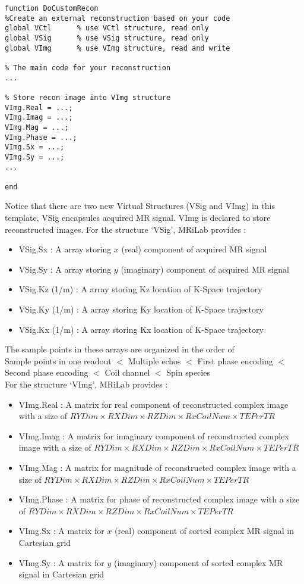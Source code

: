 \documentclass{book}%
\begin{document}
\begin{verbatim}
function DoCustomRecon
%Create an external reconstruction based on your code
global VCtl      % use VCtl structure, read only
global VSig      % use VSig structure, read only
global VImg      % use VImg structure, read and write

% The main code for your reconstruction
...

% Store recon image into VImg structure
VImg.Real = ...;
VImg.Imag = ...;
VImg.Mag = ...;
VImg.Phase = ...;
VImg.Sx = ...;
VImg.Sy = ...;
...

end
\end{verbatim}

Notice that there are two new Virtual Structures (VSig and VImg) in this template, VSig encapsules acquired MR signal. VImg is declared to store reconstructed images. For the structure `VSig', MRiLab provides :

\begin{itemize}
	\item VSig.Sx : A array storing $x$ (real) component of acquired MR signal
	\item VSig.Sy : A array storing $y$ (imaginary) component of acquired MR signal
	\item VSig.Kz (1/m) : A array storing Kz location of K-Space trajectory
	\item VSig.Ky (1/m) : A array storing Ky location of K-Space trajectory
	\item VSig.Kx (1/m) : A array storing Kx location of K-Space trajectory
\end{itemize}

The sample points in these arrays are organized in the order of \\

Sample points in one readout $<$ Multiple echos $<$ First phase encoding $<$ Second phase encoding $<$ Coil channel $<$ Spin species \\

For the structure `VImg', MRiLab provides : 
\begin{itemize}
	\item VImg.Real : A matrix for real component of reconstructed complex image with a size of $ RYDim \times RXDim \times RZDim \times RxCoilNum \times TEPerTR$
	\item VImg.Imag : A matrix for imaginary component of reconstructed complex image with a size of $ RYDim \times RXDim \times RZDim \times RxCoilNum \times TEPerTR$
	\item VImg.Mag : A matrix for magnitude of reconstructed complex image with a size of $ RYDim \times RXDim \times RZDim \times RxCoilNum \times TEPerTR$
	\item VImg.Phase : A matrix for phase of reconstructed complex image with a size of $ RYDim \times RXDim \times RZDim \times RxCoilNum \times TEPerTR$
	\item VImg.Sx : A matrix for $x$ (real) component of sorted complex MR signal in Cartesian grid
	\item VImg.Sy : A matrix for $y$ (imaginary) component of sorted complex MR signal in Cartesian grid
\end{itemize}
\end{document}
